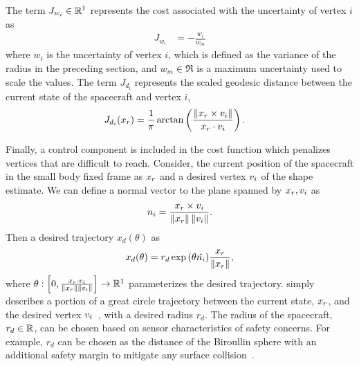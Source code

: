 \documentclass[journal]{new-aiaa}
\begin{document}
The term \( J_{w_i} \in \mathbb{R}^1 \) represents the cost associated with the uncertainty of vertex \( i \) as
\begin{align}\label{eq:weight_cost}
    J_{w_i} &= - \frac{w_i}{w_m}
\end{align}
where \( w_i \) is the uncertainty of vertex \( i \), which is defined as the variance of the radius in the preceding section, and \( w_m \in\Re \) is a maximum uncertainty used to scale the values.
The term \( J_{d_i} \) represents the scaled geodesic distance between the current state of the spacecraft and vertex \( i \),
\begin{align}\label{eq:distance_cost}
    J_{d_i}(x_r) &= \frac{1}{\pi} \arctan \left(  \frac{\left\| x_r \times v_i \right\|}{x_r \cdot v_i} \right).
\end{align}

Finally, a control component is included in the cost function which penalizes vertices that are difficult to reach.
Consider, the current position of the spacecraft in the small body fixed frame as \( x_r\) and a desired vertex \( v_i \) of the shape estimate.
We can define a normal vector to the plane spanned by \( x_r, v_i \) as
\begin{align}\label{eq:normal_to_plane}
    n_i = \frac{x_r \times v_i}{\left\| x_r \right\| \left\| v_i \right\|}.
\end{align}
Then a desired trajectory \( x_d(\theta) \) as
\begin{align}\label{eq:spherical_waypoint}
    x_d(\theta) = r_d \exp{\ensuremath{\left( \theta \hat{n_i} \right)} } \frac{x_r}{\left\| x_r \right\|},
\end{align}
where \( \theta : \left[ 0, \frac{x_r \cdot v_i}{\left\| x_r \right\|\left\| v_i \right\|} \right] \to \mathbb{R}^1\) parameterizes the desired trajectory.
 simply describes a portion of a great circle trajectory between the current state, \( x_r \), and the desired vertex \( v_i \)~\cite{chen2016}, with a desired radius $r_d$.
The radius of the spacecraft, \( r_d \in \mathbb{R} \), can be chosen based on sensor characteristics of safety concerns.
For example, \( r_d \) can be chosen as the distance of the Biroullin sphere with an additional safety margin to mitigate any surface collision~\cite{scheeres2012a}.
\end{document}
